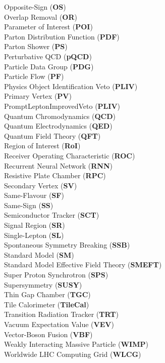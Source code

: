 Opposite-Sign (\textbf{OS}) \\
Overlap Removal (\textbf{OR}) \\
Parameter of Interest (\textbf{POI}) \\
Parton Distribution Function (\textbf{PDF}) \\
Parton Shower (\textbf{PS}) \\
Perturbative QCD (\textbf{pQCD}) \\
Particle Data Group (\textbf{PDG}) \\
Particle Flow (\textbf{PF}) \\
Physics Object Identification Veto (\textbf{PLIV}) \\
Primary Vertex (\textbf{PV}) \\
PromptLeptonImprovedVeto (\textbf{PLIV}) \\
Quantum Chromodynamics (\textbf{QCD}) \\
Quantum Electrodynamics (\textbf{QED}) \\
Quantum Field Theory (\textbf{QFT}) \\
Region of Interest (\textbf{RoI}) \\
Receiver Operating Characteristic (\textbf{ROC}) \\
Recurrent Neural Network (\textbf{RNN}) \\
Resistive Plate Chamber (\textbf{RPC}) \\
Secondary Vertex (\textbf{SV}) \\
Same-Flavour (\textbf{SF}) \\
Same-Sign (\textbf{SS}) \\
Semiconductor Tracker (\textbf{SCT}) \\
Signal Region (\textbf{SR}) \\
Single-Lepton (\textbf{SL}) \\
Spontaneous Symmetry Breaking (\textbf{SSB}) \\
Standard Model (\textbf{SM}) \\
Standard Model Effective Field Theory (\textbf{SMEFT}) \\
Super Proton Synchrotron (\textbf{SPS}) \\
Supersymmetry (\textbf{SUSY}) \\
Thin Gap Chamber (\textbf{TGC}) \\
Tile Calorimeter (\textbf{TileCal}) \\
Transition Radiation Tracker (\textbf{TRT}) \\
Vacuum Expectation Value (\textbf{VEV}) \\
Vector-Boson Fusion (\textbf{VBF}) \\
Weakly Interacting Massive Particle (\textbf{WIMP}) \\
Worldwide LHC Computing Grid (\textbf{WLCG}) \\
